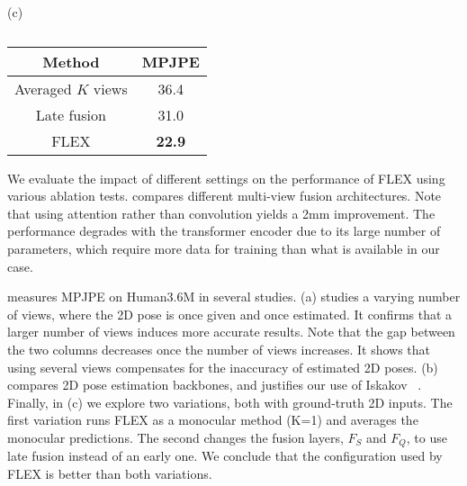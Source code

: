 {\begin{table}[t]
\begin{minipage}{.32\linewidth}
\begin{center}
\begin{tabular}{|c|c|}
\end{tabular}
\end{center}
         \label{tab:2D_backbone}
    \end{minipage}
    \hfill
    \begin{minipage}{.32\linewidth}
\setlength{\abovecaptionskip}{-11pt plus 3pt minus 2pt}
\setlength{\belowcaptionskip}{-21pt plus 3pt minus 2pt}
        \centering
\caption*{\small(c)}
        \begin{center}
\begin{tabular}{|c|c|}
\hline
\textbf{Method} & \textbf{MPJPE } \\
\hline
Averaged $K$ views & 36.4 \\
\hline
Late fusion & 31.0 \\
\hline
FLEX & \textbf{22.9} \\
\hline
\end{tabular}
\end{center}         \label{tab:ablation}
    \end{minipage}
\setlength{\abovecaptionskip}{-35pt plus 3pt minus 2pt}
\setlength{\belowcaptionskip}{-0pt plus 3pt minus 2pt}
\caption*{}
\end{table}
 }
\else{
    
    
}
\fi

We evaluate the impact of different settings on the performance of FLEX using various ablation tests. 
 compares different multi-view fusion architectures.  
Note that using attention rather than convolution yields a 2mm improvement.
The performance degrades with the transformer encoder due to its large number of parameters, which require more data for training than what is available in our case.

 measures MPJPE on Human3.6M in several studies.
(a) studies a varying number of views, where the 2D pose is once given and once estimated. It confirms that a larger number of views induces more accurate results. Note that the gap between the two columns decreases once the number of views increases. It shows that using several views compensates for the inaccuracy of estimated 2D poses. 
(b) compares 2D pose estimation backbones, and justifies our use of Iskakov \etal~\cite{iskakov2019learnable}.
Finally, in (c) we explore
two variations, both with ground-truth 2D inputs. 
The first variation runs FLEX as a monocular method (K=1) and averages the monocular predictions.
The second changes the fusion layers, $F_S$ and $F_Q$, to use late fusion instead of an early one. 
We conclude that the configuration used by FLEX is better than both variations.


